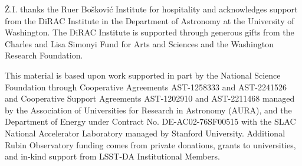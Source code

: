 \documentclass[linenumbers,amsmath,trackchanges]{aastex702}
\begin{document}

\date{\today}






 



\begin{acknowledgements}
\v{Z}.I. thanks the Ru\dj er Bo\v{s}kovi\'{c} Institute for hospitality and acknowledges support
from the DiRAC Institute in the Department of Astronomy at the University of Washington. 
The DiRAC Institute is supported through generous gifts from the Charles and Lisa Simonyi
Fund for Arts and Sciences and the Washington Research Foundation.

This material is based upon work supported in part by the National Science Foundation through
Cooperative Agreements AST-1258333 and AST-2241526 and Cooperative Support Agreements
AST-1202910 and AST-2211468 managed by the Association of Universities for Research in
Astronomy (AURA), and the Department of Energy under Contract No. DE-AC02-76SF00515 with
the SLAC National Accelerator Laboratory managed by Stanford University. Additional Rubin
Observatory funding comes from private donations, grants to universities, and in-kind support
from LSST-DA Institutional Members. 
\end{acknowledgements}
 
\vspace{5mm}
              





{}

\end{document}
